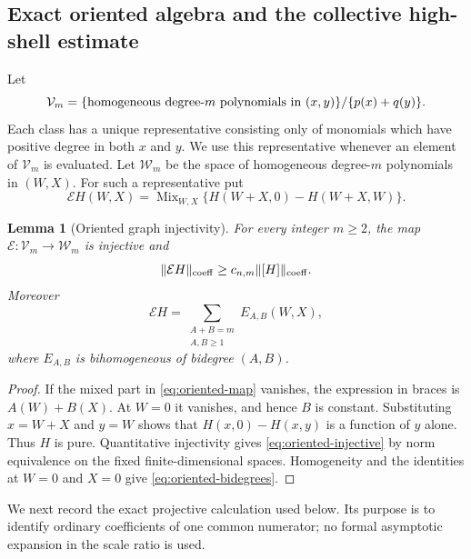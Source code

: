 \documentclass[11pt]{article}
\numberwithin{equation}{section}
\newtheorem{lemma}[theorem]{Lemma}
\theoremstyle{remark}
\theoremstyle{definition}
\newcommand{\Mix}{\operatorname{Mix}}
\newcommand{\norm}[1]{\lVert #1\rVert}
\begin{document}
\subsection{Exact oriented algebra and the collective high-shell estimate}

Let
\[
 \mathcal V_m=\{\hbox{homogeneous degree-$m$ polynomials in $(x,y)$}\}/
 \{p(x)+q(y)\}.
\]
Each class has a unique representative consisting only of monomials which
have positive degree in both \(x\) and \(y\).  We use this representative
whenever an element of \(\mathcal V_m\) is evaluated.  Let
\(\mathcal W_m\) be the space of homogeneous degree-\(m\) polynomials in
\((W,X)\).  For such a representative put
\begin{equation}\label{eq:oriented-map}
 \mathcal EH(W,X)=\Mix_{W,X}
 \{H(W+X,0)-H(W+X,W)\}.
\end{equation}

\begin{lemma}[Oriented graph injectivity]\label{lem:oriented-injective}
For every integer $m\ge2$, the map
\(\mathcal E:\mathcal V_m\to\mathcal W_m\) is injective and
\begin{equation}\label{eq:oriented-injective}
 \norm{\mathcal EH}_{\rm coeff}\ge c_{n,m}
 \norm{[H]}_{\rm coeff}.
\end{equation}
Moreover
\begin{equation}\label{eq:oriented-bidegrees}
 \mathcal EH=\sum_{\substack{A+B=m\\ A,B\ge1}}E_{A,B}(W,X),
\end{equation}
where \(E_{A,B}\) is bihomogeneous of bidegree \((A,B)\).
\end{lemma}

\begin{proof}
If the mixed part in \eqref{eq:oriented-map} vanishes, the expression
in braces is \(A(W)+B(X)\).  At \(W=0\) it vanishes, and hence \(B\) is
constant.  Substituting \(x=W+X\) and \(y=W\) shows that
\(H(x,0)-H(x,y)\) is a function of \(y\) alone.  Thus \(H\) is pure.
Quantitative injectivity gives \eqref{eq:oriented-injective} by norm
equivalence on the fixed finite-dimensional spaces.  Homogeneity and the
identities at \(W=0\) and \(X=0\) give
\eqref{eq:oriented-bidegrees}.
\end{proof}

We next record the exact projective calculation used below.  Its purpose is
to identify ordinary coefficients of one common numerator; no formal
asymptotic expansion in the scale ratio is used.
\end{document}
